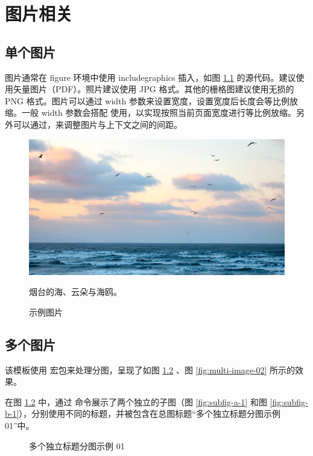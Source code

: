 \documentclass[
    report,     %
    oneside,    %
    UTF8,       %
    zihao=-4    %
]{config} %
\begin{document}

\chapter{图片相关}


\section{单个图片}

图片通常在 figure 环境中使用 includegraphics 插入，如图 \ref{fig:example1} 的源代码。建议使用矢量图片（PDF）。照片建议使用 JPG 格式。其他的栅格图建议使用无损的 PNG 格式。图片可以通过 width 参数来设置宽度，设置宽度后长度会等比例放缩。一般 width 参数会搭配  使用，以实现按照当前页面宽度进行等比例放缩。另外可以通过，来调整图片与上下文之间的间距。

\begin{figure}[H] %
    \centering %
    \includegraphics[width=0.75\linewidth]{figures/example2.jpg} %
    \caption*{烟台的海、云朵与海鸥。} %
    \caption{示例图片} %
    \label{fig:example1} %
\end{figure}
\vspace{-0.7em}  %


\section{多个图片}


该模板使用  宏包来处理分图，呈现了如图 \ref{fig:multi-image-01} 、图 \ref{fig:multi-image-02} 所示的效果。

在图 \ref{fig:multi-image-01} 中，通过  命令展示了两个独立的子图（图 \ref{fig:subfig-a-1} 和图 \ref{fig:subfig-b-1}），分别使用不同的标题，并被包含在总图标题“多个独立标题分图示例 01”中。

\begin{figure}[H]
    \centering
    \caption{多个独立标题分图示例 01}
    \label{fig:multi-image-01}
\end{figure}
\vspace{-0.7em}  %
\end{document}
